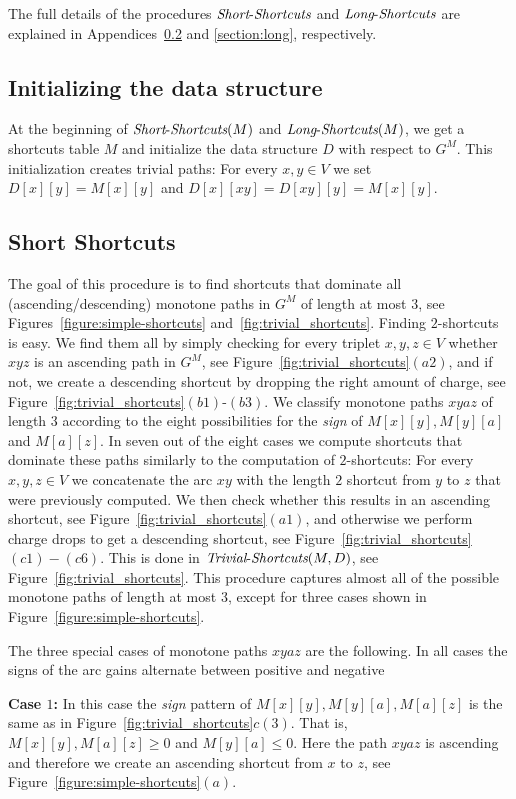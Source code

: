 \documentclass[11pt]{article}
\newcommand{\LS}{\mbox{{\it Long}-{\it Shortcuts}}}
\newcommand{\Simple}{\mbox{{\it Short}-{\it Shortcuts}}}
\newcommand{\Trivial}{\mbox{{\it Trivial}-{\it Shortcuts}}}
\begin{document}
The full details of the procedures $\Simple$ and $\LS$ are explained in Appendices~\ref{section:simple} and \ref{section:long}, respectively.


\subsection{Initializing the data structure}
At the beginning of $\Simple(M)$ and $\LS(M)$, we get a shortcuts table $M$ and initialize the data structure $D$ with respect to $G^M$. This initialization creates trivial paths: For every $x,y\in V$ we set $D[x][y]=M[x][y]$ and $D[x][xy]=D[xy][y] = M[x][y]$.

\subsection{Short Shortcuts}\label{section:simple}
The goal of this procedure is to find shortcuts that dominate all (ascending/descending) monotone paths in $G^M$ of length at most $3$, see Figures~\ref{figure:simple-shortcuts} and~\ref{fig:trivial_shortcuts}. Finding $2$-shortcuts is easy. 
We find them all by simply checking for every triplet $x,y,z\in V$ whether $xyz$ is an ascending path in $G^M$, see Figure~\ref{fig:trivial_shortcuts}$(a2)$, and if not, we create a descending shortcut by dropping the right amount of charge, see Figure~\ref{fig:trivial_shortcuts}$(b1)$-$(b3)$. 
We classify monotone paths $xyaz$ of length $3$ according to the eight possibilities for the \emph{sign} of $M[x][y], M[y][a]$ and $M[a][z]$. In seven out of the eight cases we compute shortcuts that dominate these paths similarly to the computation of $2$-shortcuts: For every $x,y,z\in V$ we concatenate the arc $xy$ with the length $2$ shortcut from $y$ to $z$ that were previously computed. We then check whether this results in an ascending shortcut, see Figure~\ref{fig:trivial_shortcuts}$(a1)$, and otherwise we perform charge drops to get a descending shortcut, see Figure~\ref{fig:trivial_shortcuts}$(c1)-(c6)$.
This is done in
 $\Trivial(M,D)$, see Figure~\ref{fig:trivial_shortcuts}. This procedure captures almost all of the possible monotone paths of length at most $3$, except for three cases shown in Figure~\ref{figure:simple-shortcuts}. 

The three special cases of monotone paths $xyaz$ are the following. In all cases the signs of the arc gains alternate between positive and negative

\textbf{Case $1$:} In this case the \emph{sign} pattern of $M[x][y],M[y][a],M[a][z]$ is the same as in Figure~\ref{fig:trivial_shortcuts}$c(3)$. That is, $M[x][y],M[a][z]\ge 0$ and $M[y][a]\le 0$.
Here the path $xyaz$ is ascending and therefore we create an ascending shortcut from $x$ to $z$, see Figure~\ref{figure:simple-shortcuts}$(a)$.
\end{document}
